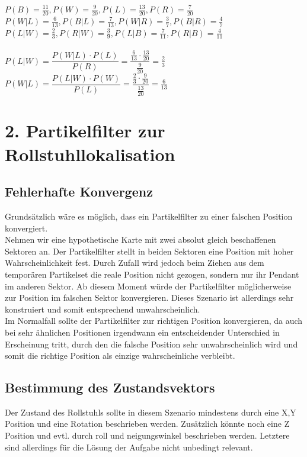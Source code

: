 \documentclass{../Vorlage/mat}
\begin{document}
$P(B) = \frac{11}{20}, P(W) = \frac{9}{20}, P(L) = \frac{13}{20}, P(R) = \frac{7}{20}$\\
$P(W|L) = \frac{6}{13}, P(B|L) = \frac{7}{13}, P(W|R) = \frac{3}{7}, P(B|R) = \frac{4}{7}$\\
$P(L|W) = \frac{2}{3}, P(R|W) = \frac{3}{9}, P(L|B) = \frac{7}{11}, P(R|B) = \frac{4}{11}$\\
\\
$P(L|W) = \dfrac{P(W|L) \cdot P(L)}{P(R)} = \dfrac{\frac{6}{13} \cdot \frac{13}{20}}{\frac{9}{20}} = \frac{2}{3}$\\
$P(W|L) = \dfrac{P(L|W) \cdot P(W)}{P(L)} = \dfrac{\frac{2}{3} \cdot \frac{9}{20}}{\frac{13}{20}} = \frac{6}{13}$


\section*{2. Partikelfilter zur Rollstuhllokalisation}
\subsection*{Fehlerhafte Konvergenz}
Grundsätzlich wäre es möglich, dass ein Partikelfilter zu einer falschen Position konvergiert.\\
Nehmen wir eine hypothetische Karte mit zwei absolut gleich beschaffenen Sektoren an. Der Partikelfilter stellt in beiden Sektoren eine Position mit hoher Wahrscheinlichkeit fest. Durch Zufall wird jedoch beim Ziehen aus dem temporären Partikelset die reale Position nicht gezogen, sondern nur ihr Pendant im anderen Sektor. Ab diesem Moment würde der Partikelfilter möglicherweise zur Position im falschen Sektor konvergieren. Dieses Szenario ist allerdings sehr konstruiert und somit entsprechend unwahrscheinlich.\\
Im Normalfall sollte der Partikelfilter zur richtigen Position konvergieren, da auch bei sehr ähnlichen Positionen irgendwann ein entscheidender Unterschied in Erscheinung tritt, durch den die falsche Position sehr unwahrscheinlich wird und somit die richtige Position als einzige wahrscheinliche verbleibt.
\subsection*{Bestimmung des Zustandsvektors}
Der Zustand des Rollstuhls sollte in diesem Szenario mindestens durch eine X,Y Position und eine Rotation beschrieben werden. Zusätzlich könnte noch eine Z Position und evtl. durch roll und neigungswinkel beschrieben werden. Letztere sind allerdings für die Lösung der Aufgabe nicht unbedingt relevant.
\end{document}
